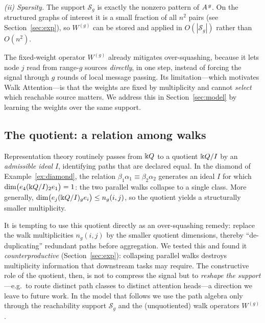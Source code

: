 \emph{(ii) Sparsity.} The support $\mathcal{S}_g$ is exactly the nonzero pattern
of $A^{\,g}$. On the structured graphs of interest it is a small fraction of
all $n^2$ pairs (see Section~\ref{sec:exp}), so $W^{(g)}$ can be stored and
applied in $O(|\mathcal{S}_g|)$ rather than $O(n^2)$.

The fixed-weight operator $W^{(g)}$ already mitigates over-squashing, because it
lets node $j$ read from range-$g$ sources \emph{directly}, in one step, instead
of forcing the signal through $g$ rounds of local message passing. Its
limitation---which motivates Walk Attention---is that the weights are fixed by
multiplicity and cannot \emph{select} which reachable source matters. We address
this in Section~\ref{sec:model} by learning the weights over the same support.

\subsection{The quotient: a relation among walks}

Representation theory routinely passes from $\Bbbk Q$ to a quotient $\Bbbk Q/I$ by an
\emph{admissible ideal} $I$, identifying paths that are declared equal. In the
diamond of Example~\ref{ex:diamond}, the relation $\beta_1\alpha_1\equiv
\beta_2\alpha_2$ generates an ideal $I$ for which
$\dim\bigl(e_4(\Bbbk Q/I)_2 e_1\bigr)=1$: the two parallel walks collapse to a single
class. More generally, $\dim\bigl(e_j(\Bbbk Q/I)_g e_i\bigr)\le n_g(i,j)$, so the
quotient yields a structurally smaller multiplicity.

It is tempting to use this quotient directly as an over-squashing remedy:
replace the walk multiplicities $n_g(i,j)$ by the smaller quotient dimensions,
thereby ``de-duplicating'' redundant paths before aggregation. We tested this and
found it \emph{counterproductive} (Section~\ref{sec:exp}): collapsing parallel
walks destroys multiplicity information that downstream tasks may require. The
constructive role of the quotient, then, is not to compress the signal but to
\emph{reshape the support}---e.g.\ to route distinct path classes to distinct
attention heads---a direction we leave to future work. In the model that follows
we use the path algebra only through the reachability support $\mathcal{S}_g$ and
the (unquotiented) walk operators $W^{(g)}$.
